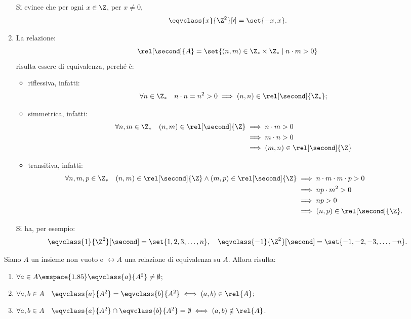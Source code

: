 \begin{examples}
\begin{enumerate}
\[            \]
            Si evince che per ogni \(x \in \Z\), per \(x \neq 0\),
            \[
               \eqvclass{x}{\Z^2}[\prime] = \set{-x, x}.
            \]
%
        \item La relazione:
            \[
                \rel[\second]{A} = \set{(n, m) \in \Z_* \times \Z_* \mid n \cdot m > 0}
            \]
            risulta essere di equivalenza, perché è:
            \begin{itemize}
                \item riflessiva, infatti:
                    \[
                        \forall n \in \Z_* \quad n \cdot n = n^2 > 0 \implies (n, n) \in \rel[\second]{\Z_*};
                    \]
                \item simmetrica, infatti:
                    \begin{alignat*}{1}
                        \forall n,m \in \Z_* \quad (n, m) \in \rel[\second]{\Z}
                            &\implies n \cdot m > 0 \\
                            &\implies m \cdot n > 0 \\
                            &\implies (m, n) \in \rel[\second]{\Z}
                    \end{alignat*}
                \item transitiva, infatti:
                    \begin{alignat*}{1}
                        \forall n,m,p \in \Z_* \quad (n, m) \in \rel[\second]{\Z} \land (m, p) \in \rel[\second]{\Z}
                            &\implies n \cdot m \cdot m \cdot p > 0 \\
                            &\implies np \cdot m^2 > 0 \\
                            &\implies np > 0 \\
                            &\implies (n, p) \in \rel[\second]{\Z}.
                    \end{alignat*}
            \end{itemize}
        Si ha, per esempio:
        \[
           \eqvclass{1}{\Z^2}[\second] = \set{1, 2, 3, \dotsc, n}, \quad
           \eqvclass{-1}{\Z^2}[\second] = \set{-1, -2, -3, \dotsc, -n}.
        \]
    \end{enumerate}
\end{examples}


\begin{proposition}\label{prop:proprietà_classi_di_equivalenza}
    Siano \(A\) un insieme non vuoto e \(\rel{A}\) una relazione di equivalenza su \(A\). Allora risulta:
    \begin{enumerate}
        \item \(\forall a \in A \emspace{1.85} \eqvclass{a}{A^2} \neq \emptyset\);
        \item \(\forall a,b \in A \quad \eqvclass{a}{A^2} = \eqvclass{b}{A^2} \iff (a, b) \in \rel{A}\);
        \item \(\forall a,b \in A \quad \eqvclass{a}{A^2} \cap \eqvclass{b}{A^2} = \emptyset \iff (a, b) \notin \rel{A}\).
    \end{enumerate}
\end{proposition}

